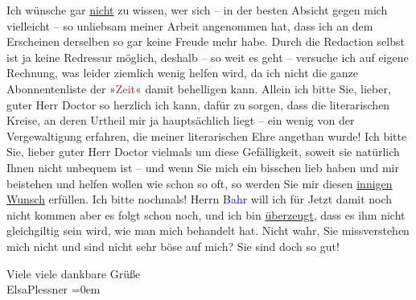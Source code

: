 \pstart
           {\pb}Ich wünsche gar \uline{nicht} zu wissen, wer sich – in
                    der besten Absicht gegen mich vielleicht – so unliebsam meiner Arbeit angenommen
                    hat, dass ich an dem Erscheinen derselben so gar keine Freude mehr habe. Durch
                    die Redaction selbst ist ja keine Redressur möglich, deshalb – so weit es geht –
                    versuche ich auf eigene Rechnung, was leider ziemlich wenig helfen wird, da ich
                    nicht die ganze Abonnentenliste der »\textcolor{brown}{Zeit}{}\ledrightnote{\textcolor{brown}{Die Zeit. Wiener Wochenschrift}}«
                    damit behelligen kann. Allein ich bitte Sie, lieber, guter Herr Doctor so
                    herzlich ich kann, dafür zu sorgen, dass die literarischen Kreise, an deren
                    Urtheil {\pb}mir ja hauptsächlich liegt – ein wenig von der Vergewaltigung
                    erfahren, die meiner literarischen Ehre angethan wurde! Ich bitte Sie, lieber
                    guter Herr Doctor vielmals um diese Gefälligkeit, soweit sie natürlich Ihnen
                    nicht unbequem ist – und wenn Sie mich ein bisschen lieb haben und mir beistehen
                    und helfen wollen wie schon so oft, so werden Sie mir diesen \uline{innigen Wunsch} erfüllen. {\pb}Ich bitte
                    nochmals! Herrn \textcolor{blue}{Bahr}{}\ledrightnote{\textcolor{blue}{Hermann Bahr}} will ich für Jetzt
                    damit noch nicht kommen aber es folgt schon noch, und ich bin \uline{überzeugt}, dass es ihm nicht gleichgiltig sein
                    wird, wie man mich behandelt hat. Nicht wahr, Sie missverstehen mich nicht und
                    sind nicht sehr böse auf mich? Sie sind doch so gut!\pend
           
\pstart
           Viele viele dankbare Grüße{\\[\baselineskip]}\spacefill\mbox{ElsaPlessner}\pend
           \leftskip=0em{}\endnumbering{}
\begin{anhang}
\end{anhang}
      